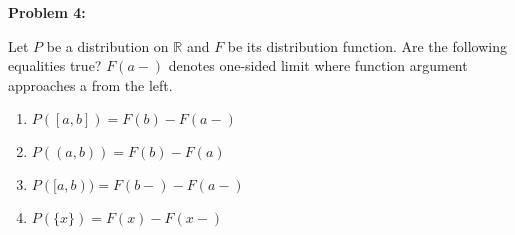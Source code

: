 \textbf{Problem 4:}

\singlespacing

Let $P$ be a distribution on $\mathbb{R}$ and $F$ be its distribution function. Are
the following equalities true? $F(a-)$ denotes one-sided limit where function argument
approaches a from the left.

\begin{enumerate}
    \item $P([a, b]) = F(b) - F(a -)$
    \item $P((a, b)) = F(b) - F(a)$
    \item $P([a, b)) = F(b -) - F(a -)$
    \item $P(\{x\}) = F(x) - F(x -)$
\end{enumerate}
